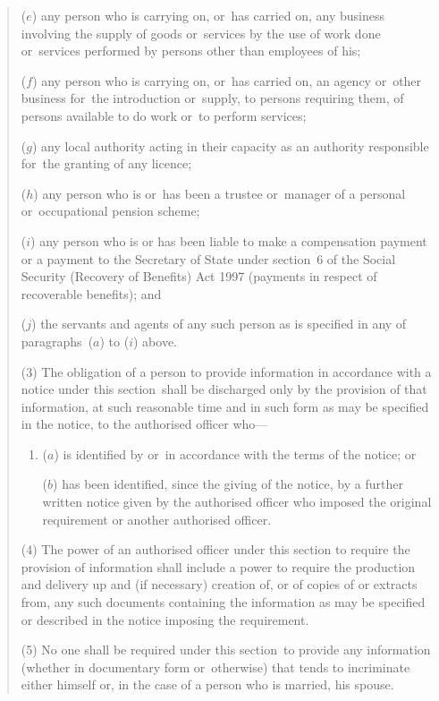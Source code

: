 \documentclass[12pt,a4paper]{article}
\begin{document}
\begin{quotation}
\begin{enumerate}
($e$) any person who is carrying on, or~has carried on, any business involving the supply of goods or~services by the use of work done or~services performed by persons other than employees of his;

($f$) any person who is carrying on, or~has carried on, an agency or~other business for~the introduction or~supply, to persons requiring them, of persons available to do work or~to perform services;

($g$) any local authority acting in their capacity as an authority responsible for~the granting of any licence;

($h$) any person who is or~has been a trustee or~manager of a personal or~occupational pension scheme;

($i$) any person who is or has been liable to make a compensation payment or a payment to the Secretary of State under section~6 of the Social Security (Recovery of Benefits) Act 1997 (payments in respect of recoverable benefits); and

($j$) the servants and agents of any such person as is specified in any of paragraphs~($a$)  to ($i$)  above.
\end{enumerate}

(3) The obligation of a person to provide information in accordance with a notice under this section~shall be discharged only by the provision of that information, at such reasonable time and in such form as may be specified in the notice, to the authorised officer who—
\begin{enumerate}\item[]
($a$) is identified by or~in accordance with the terms of the notice; or

($b$) has been identified, since the giving of the notice, by a further written notice given by the authorised officer who imposed the original requirement or another authorised officer.
\end{enumerate}

(4) The power of an authorised officer under this section to require the provision of information shall include a power to require the production and delivery up and (if necessary) creation of, or of copies of or extracts from, any such documents containing the information as may be specified or described in the notice imposing the requirement.

(5) No one shall be required under this section~to provide any information (whether in documentary form or~otherwise) that tends to incriminate either himself or, in the case of a person who is married, his spouse.


\end{quotation}
\end{document}
